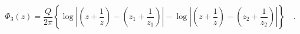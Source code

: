 \begin{equation}
\Phi_3(z)=\frac{Q}{2\pi}\left\{\log\left|\left(z+\frac{1}{z}\right)-\left(z_1+\frac{1}{z_1}\right)\right| -\log\left|\left(z+\frac{1}{z}\right)-\left(z_2+\frac{1}{z_2}\right)\right|\right\}\quad.
\end{equation}

